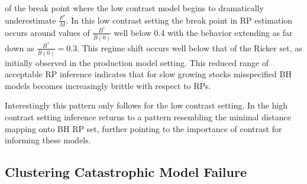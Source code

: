 %
of the break point where the low contrast model begins to dramatically underestimate $\frac{F^*}{M}$.
%
In this low contrast setting the break point in RP estimation occurs around values of
$\frac{B^*}{\bar B(0)}$ well below 0.4 with the behavior extending as far down as 
\mbox{$\frac{B^*}{\bar B(0)}=0.3$}. This regime shift occurs well below that of the Ricker
set, as initially observed in the production model setting.
This reduced range of acceptable RP inference indicates that for slow growing stocks 
misspecified BH models becomes increasingly brittle with respect to RPs.

%
Interestingly this pattern only follows for the low contrast setting. In the high
contrast setting inference returns to a pattern resembling the minimal distance
mapping onto BH RP set, further pointing to the importance of contrast for informing
these models.

%

%
\subsection{Clustering Catastrophic Model Failure}



